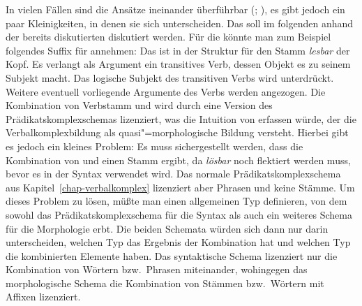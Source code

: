 In vielen Fällen sind die Ansätze ineinander überführbar (\citealp[--169]{Koenig99a}; \citealp[Kapitel~6.2.5.2]{Mueller2002b}),
es gibt jedoch ein paar Kleinigkeiten, in denen sie sich unterscheiden. Das soll im folgenden
anhand der bereits diskutierten \bard diskutiert werden.
Für die \bard könnte man zum Beispiel folgendes Suffix für  annehmen:
\eas
{}%
\zs
Das \bars ist in der Struktur für den Stamm \emph{lesbar} der Kopf. Es verlangt als Argument ein transitives
Verb, dessen Objekt  es zu seinem Subjekt macht. Das logische Subjekt des transitiven Verbs wird unterdrückt.
Weitere eventuell vorliegende Argumente des Verbs  werden angezogen.
Die Kombination von Verbstamm und  wird durch eine Version des Prädikatskomplexschemas lizenziert,
was die Intuition von \citet{Bierwisch90a} erfassen würde, der die Verbalkomplexbildung als quasi"=morphologische
Bildung versteht. Hierbei gibt es jedoch ein kleines Problem: Es muss sichergestellt werden, dass die Kombination
von  und  einen Stamm ergibt, da \emph{lösbar} noch flektiert werden muss, bevor es in
der Syntax verwendet wird. Das normale Prädikatskomplexschema aus Kapitel~\ref{chap-verbalkomplex} lizenziert
aber Phrasen und keine Stämme. Um dieses Problem zu lösen, müßte man einen allgemeinen Typ definieren,
von dem sowohl das Prädikatskomplexschema für die Syntax als auch ein weiteres Schema für die Morphologie erbt.
Die beiden Schemata würden sich dann nur darin unterscheiden, welchen Typ das Ergebnis der Kombination hat und
welchen Typ die kombinierten Elemente haben. Das syntaktische Schema lizenziert nur die Kombination von Wörtern
bzw.\ Phrasen miteinander, wohingegen das morphologische Schema die Kombination von Stämmen bzw.\ Wörtern mit
Affixen lizenziert.

